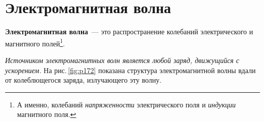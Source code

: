 \documentclass[main.tex]{subfiles}
\begin{document}

\pagestyle{empty}

 

\setcounter{section}{46
}
\addtocounter{section}{-1} 

\section{Электромагнитная волна}


\textbf{Электромагнитная волна}~--- это распространение колебаний электрического и магнитного полей\footnote{А именно, колебаний \emph{напряженности} электрического поля и \emph{индукции} магнитного поля.}. 

\emph{Источником электромагнитных волн является любой заряд, движущийся с ускорением.} На рис.\,\ref{fig:p172} показана структура электромагнитной волны вдали от колеблющегося заряда, излучающего эту волну.
\end{document}
